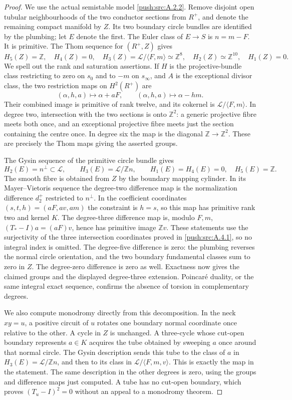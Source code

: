 \begin{proof}
We use the actual semistable model \ref{push:src:A.2.2}. Remove disjoint
open tubular neighbourhoods of the two conductor sections
from $R^+$, and denote the remaining compact manifold by
$Z$. Its two boundary circle bundles are identified by the
plumbing; let $E$ denote the first. The Euler class of
$E\to S$ is $n=m-F$. It is primitive. The Thom sequence
for $(R^+,Z)$ gives
\[
 H_5(Z)=\mathbb Z,\quad H_4(Z)=0,\quad
 H_3(Z)=\mathcal L/\langle F,m\rangle\simeq\mathbb Z^8,
 \quad H_2(Z)\simeq\mathbb Z^{10},\quad H_1(Z)=0.
\]
We spell out the rank and saturation assertions. If $H$ is
the projective-bundle class restricting to zero on $s_0$
and to $-m$ on $s_\infty$, and $A$ is the exceptional
divisor class, the two restriction maps on $H^2(R^+)$ are
\[
 (\alpha,h,a)\longmapsto\alpha+aF,\qquad
 (\alpha,h,a)\longmapsto\alpha-hm.
\]
Their combined image is primitive of rank twelve, and its
cokernel is $\mathcal L/\langle F,m\rangle$. In degree two,
intersection with the two sections is onto $\mathbb Z^2$:
a generic projective fibre meets both once, and an exceptional
projective fibre meets just the section containing the centre
once. In degree six the map is the diagonal
$\mathbb Z\to\mathbb Z^2$. These are precisely the Thom
maps giving the asserted groups.

The Gysin sequence of the primitive circle bundle gives
\[
 H_2(E)=n^\perp\subset\mathcal L,\qquad
 H_3(E)=\mathcal L/\mathbb Z n,\qquad
 H_1(E)=H_4(E)=0,\quad H_5(E)=\mathbb Z.
\]
The smooth fibre is obtained from $Z$ by the boundary
mapping cylinder. In its Mayer--Vietoris sequence the
degree-two difference map is the normalization difference
$d_2^+$ restricted to $n^\perp$. In the coefficient
coordinates $(s,t,h)=(aF,av,am)$ the constraint is $h=s$,
so this map has primitive rank two and kernel $K$.
The degree-three difference map is, modulo $F,m$,
$(T_*-I)a=(aF)v$, hence has primitive image $\mathbb Z v$.
These statements use the surjectivity of the three
intersection coordinates proved in \ref{push:src:A.4.1}, so no integral
index is omitted. The degree-five difference is zero:
the plumbing reverses the normal circle orientation, and
the two boundary fundamental classes sum to zero in $Z$.
The degree-zero difference is zero as well. Exactness now
gives the claimed groups and the displayed degree-three
extension. Poincar\'e duality, or the same integral exact
sequence, confirms the absence of torsion in complementary
degrees.

We also compute monodromy directly from this decomposition.
In the neck $xy=u$, a positive circuit of $u$ rotates one
boundary normal coordinate once relative to the other.
A cycle in $Z$ is unchanged. A three-cycle whose cut-open
boundary represents $a\in K$ acquires the tube obtained
by sweeping $a$ once around that normal circle. The Gysin
description sends this tube to the class of $a$ in
$H_3(E)=\mathcal L/\mathbb Z n$, and then to its class in
$\mathcal L/\langle F,m,v\rangle$. This is exactly the
map in the statement. The same description in the other
degrees is zero, using the groups and difference maps just
computed. A tube has no cut-open boundary, which proves
$(T_u-I)^2=0$ without an appeal to a monodromy theorem.


\end{proof}
